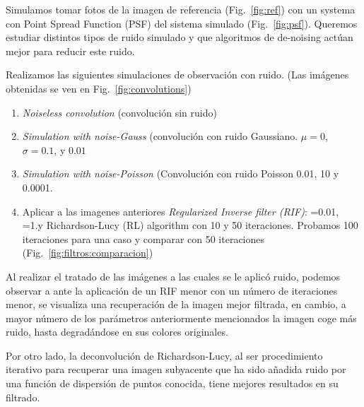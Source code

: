\documentclass{./packages/optica-article}
\begin{document}
Simulamos tomar fotos de la imagen de referencia (Fig.~\ref{fig:ref}) con un systema con Point Spread Function (PSF) del sistema simulado (Fig.~\ref{fig:psf}). Queremos estudiar distintos tipos de ruido simulado y que algoritmos de de-noising actúan mejor para reducir este ruido.

Realizamos las siguientes simulaciones de observación con ruido. (Las imágenes obtenidas se ven en Fig.~\ref{fig:convolutions})

\begin{enumerate}
	\item \emph{Noiseless convolution} (convolución sin ruido)
	\item \emph{Simulation with noise-Gauss} (convolución con ruido Gaussiano. $\mu=0$, $\sigma=0.1$, y $0.01$
	\item \emph{Simulation with noise-Poisson} (Convolución con ruido Poisson 0.01, 10 y 0.0001.
	\item Aplicar a las imagenes anteriores \emph{Regularized Inverse filter (RIF)}: =0.01, =1.y Richardson-Lucy (RL) algorithm con 10 y 50 iteraciones. Probamos 100 iteraciones para una caso y comparar con 50 iteraciones (Fig.~\ref{fig:filtros:comparacion})
\end{enumerate}

Al realizar el tratado de las imágenes a las cuales se le aplicó ruido, podemos observar a ante la aplicación de un RIF menor con un número de iteraciones menor, se visualiza una recuperación de la imagen mejor filtrada, en cambio, a mayor número de los parámetros anteriormente mencionados la imagen coge más ruido, hasta degradándose en sus colores originales.

Por otro lado, la deconvolución de Richardson-Lucy, al ser procedimiento iterativo para recuperar una imagen subyacente que ha sido añadida ruido por una función de dispersión de puntos conocida, tiene mejores resultados en su filtrado.
\end{document}
